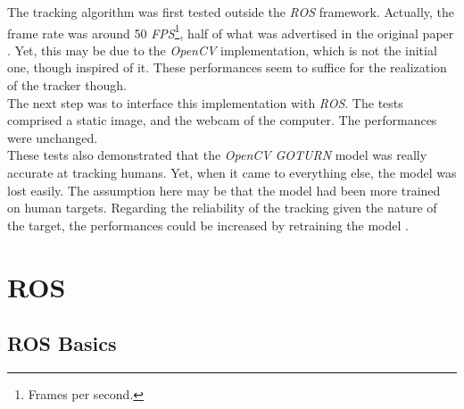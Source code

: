 		The tracking algorithm was first tested outside the \textit{ROS}
		framework. Actually, the frame rate was around 50 \textit{FPS}\footnote{Frames per second.},
		half of what was advertised
		in the original paper \cite{goturn}. Yet, this may be due to
		the \textit{OpenCV} implementation, which is not 
		the initial one, though inspired of it. 
		These performances seem to suffice for the realization of the tracker though.
		\\\indent The next step was to interface this implementation 
		with \textit{ROS}. The tests comprised a static image, and 
		the webcam of the computer. The performances were unchanged.
		\\\indent These tests also demonstrated that the \textit{OpenCV}
		\textit{GOTURN} model was really accurate at tracking
		humans. Yet, when it came to everything else, the model 
		was lost easily. The assumption here may be that 
		the model had been more trained on human targets. 
		Regarding the reliability of the tracking given 
		the nature of the target, the performances
		could be increased by retraining the model \cite{goturnpy}.
		
	\section{ROS}\label{ros}
	

		
		
		\subsection{ROS Basics}
		
